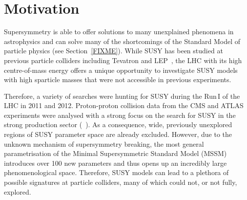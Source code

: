 \FloatBarrier
\chapter{Motivation}
\label{sec:Motivation}
Supersymmetry is able to offer solutions to many unexplained phenomena in astrophysics and can solve many of the shortcomings of the Standard Model of particle physics (see Section~\ref{FIXME}).
While SUSY has been studied at previous particle colliders including Tevatron and LEP~\cite{bib:Tevatron:SUSY_results,bib:LEP:SUSY_results}, the LHC with its high centre-of-mass energy offers a unique opportunity to investigate SUSY models with high sparticle masses that were not accessible in previous experiments.

Therefore, a variety of searches were hunting for SUSY during the Run\,I of the LHC in 2011 and 2012.
Proton-proton collision data from the CMS and ATLAS experiments were analysed with a strong focus on the search for SUSY in the strong production sector (\eg~\cite{bib:CMS:RA2_8TeV,bib:CMS:MT2_8TeV,bib:ATLAS:JetPlusMET_8TeV}).
As a consequence, wide, previously unexplored regions of SUSY parameter space are already excluded.
However, due to the unknown mechanism of supersymmetry breaking, the most general parametrisation of the Minimal Supersymmetric Standard Model (MSSM) introduces over 100 new parameters and thus opens up an incredibly large phenomenological space. 
Therefore, SUSY models can lead to a plethora of possible signatures at particle colliders, many of which could not, or not fully, explored. \\


